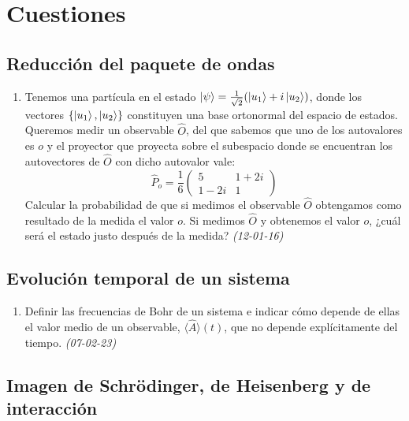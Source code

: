 \section{Cuestiones}

\subsection*{Reducción del paquete de ondas}

\begin{enumerate}
    
    \item Tenemos una partícula en el estado $\ket{\psi} = \frac{1}{\sqrt{2}} (\ket{u_1} + i \ket{u_2})$, donde los vectores $\{\ket{u_1}, \ket{u_2}\}$ constituyen una base ortonormal del espacio de estados. Queremos medir un observable $\hat{O}$, del que sabemos que uno de los autovalores es $o$ y el proyector que proyecta sobre el subespacio donde se encuentran los autovectores de $\hat{O}$ con dicho autovalor vale:
    \[
    \hat{P}_o = \frac{1}{6} \begin{pmatrix} 5 & 1 + 2i \\ 1 - 2i & 1 \end{pmatrix}
    \]
    Calcular la probabilidad de que si medimos el observable $\hat{O}$ obtengamos como resultado de la medida el valor $o$. Si medimos $\hat{O}$ y obtenemos el valor $o$, ¿cuál será el estado justo después de la medida? \textit{(12-01-16)}

\end{enumerate}

\subsection*{Evolución temporal de un sistema}

\begin{enumerate}

    \item Definir las frecuencias de Bohr de un sistema e indicar cómo depende de ellas el valor medio de un observable, $\langle \hat{A} \rangle (t)$, que no depende explícitamente del tiempo. \textit{(07-02-23)}
    

\end{enumerate}

\subsection*{Imagen de Schrödinger, de Heisenberg y de interacción}

